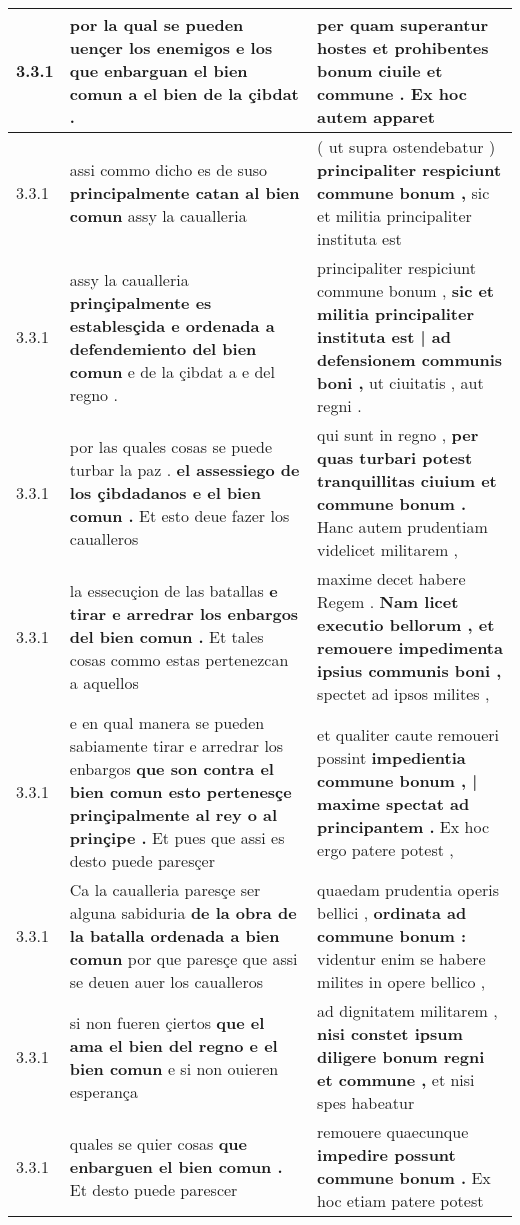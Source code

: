 \begin{tabular}{|p{1cm}|p{6.5cm}|p{6.5cm}|}
3.3.1 & por la qual se pueden uençer los enemigos \textbf{ e los que enbarguan el bien comun } a el bien de la çibdat . & per quam superantur hostes \textbf{ et prohibentes bonum ciuile et commune . } Ex hoc autem apparet \\\hline
3.3.1 & assi commo dicho es de suso \textbf{ principalmente catan al bien comun } assy la caualleria & ( ut supra ostendebatur ) \textbf{ principaliter respiciunt commune bonum , } sic et militia principaliter instituta est \\\hline
3.3.1 & assy la caualleria \textbf{ prinçipalmente es establesçida e ordenada a defendemiento del bien comun } e de la çibdat a e del regno . & principaliter respiciunt commune bonum , \textbf{ sic et militia principaliter instituta est | ad defensionem communis boni , } ut ciuitatis , aut regni . \\\hline
3.3.1 & por las quales cosas se puede turbar la paz . \textbf{ el assessiego de los çibdadanos e el bien comun . } Et esto deue fazer los caualleros & qui sunt in regno , \textbf{ per quas turbari potest tranquillitas ciuium et commune bonum . } Hanc autem prudentiam videlicet militarem , \\\hline
3.3.1 & la essecuçion de las batallas \textbf{ e tirar e arredrar los enbargos del bien comun . } Et tales cosas commo estas pertenezcan a aquellos & maxime decet habere Regem . \textbf{ Nam licet executio bellorum , et remouere impedimenta ipsius communis boni , } spectet ad ipsos milites , \\\hline
3.3.1 & e en qual manera se pueden sabiamente tirar e arredrar los enbargos \textbf{ que son contra el bien comun esto pertenesçe prinçipalmente al rey o al prinçipe . } Et pues que assi es desto puede paresçer & et qualiter caute remoueri possint \textbf{ impedientia commune bonum , | maxime spectat ad principantem . } Ex hoc ergo patere potest , \\\hline
3.3.1 & Ca la caualleria paresçe ser alguna sabiduria \textbf{ de la obra de la batalla ordenada a bien comun } por que paresçe que assi se deuen auer los caualleros & quaedam prudentia operis bellici , \textbf{ ordinata ad commune bonum : } videntur enim se habere milites in opere bellico , \\\hline
3.3.1 & si non fueren çiertos \textbf{ que el ama el bien del regno e el bien comun } e si non ouieren esperança & ad dignitatem militarem , \textbf{ nisi constet ipsum diligere bonum regni et commune , } et nisi spes habeatur \\\hline
3.3.1 & quales se quier cosas \textbf{ que enbarguen el bien comun . } Et desto puede parescer & remouere quaecunque \textbf{ impedire possunt commune bonum . } Ex hoc etiam patere potest \\\hline

\end{tabular}
